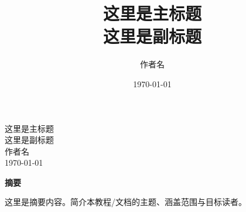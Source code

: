 \documentclass[12pt,a4paper]{ctexart}
\title{\huge 这里是主标题\\ \large 这里是副标题}
\author{作者名}
\date{\today}
\begin{document}
\clearpage
\vspace*{\fill}

\begin{center}
{\huge 这里是主标题}\\[0.8em]
{\large 这里是副标题}\\[2.5em]
{\large 作者名}\\[0.6em]
{\large \today}
\end{center}

\vspace{2.5em}

\begin{center}
{\bfseries 摘要}
\end{center}

\vspace{1em}

\begin{center}
这里是摘要内容。简介本教程/文档的主题、涵盖范围与目标读者。
\end{center}

\vspace*{\fill}
\clearpage

\tableofcontents
\clearpage


\newpage

\end{document}
